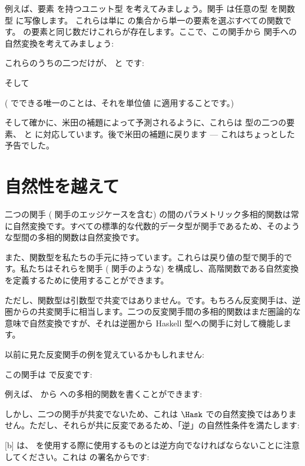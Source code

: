 例えば、要素 \code{()} を持つユニット型 \code{()} を考えてみましょう。関手  は任意の型  を関数型  に写像します。
これらは単に  の集合から単一の要素を選ぶすべての関数です。
 の要素と同じ数だけこれらが存在します。ここで、この関手から  関手への自然変換を考えてみましょう: 

これらのうちの二つだけが、 と  です: 

そして

 ( でできる唯一のことは、それを単位値 \code{()} に適用することです。) 

そして確かに、米田の補題によって予測されるように、これらは  型の二つの要素、 と  に対応しています。後で米田の補題に戻ります --- これはちょっとした予告でした。

\section{自然性を越えて}

二つの関手 ( 関手のエッジケースを含む) の間のパラメトリック多相的関数は常に自然変換です。すべての標準的な代数的データ型が関手であるため、そのような型間の多相的関数は自然変換です。

また、関数型を私たちの手元に持っています。これらは戻り値の型で関手的です。私たちはそれらを関手 ( 関手のような) を構成し、高階関数である自然変換を定義するために使用することができます。

ただし、関数型は引数型で共変ではありません。です。もちろん反変関手は、逆圏からの共変関手に相当します。二つの反変関手間の多相的関数はまだ圏論的な意味で自然変換ですが、それは逆圏から Haskell 型への関手に対して機能します。

以前に見た反変関手の例を覚えているかもしれません: 

この関手は  で反変です: 

例えば、 から  への多相的関数を書くことができます: 

しかし、二つの関手が共変でないため、これは $\Hask$ での自然変換ではありません。ただし、それらが共に反変であるため、「逆」の自然性条件を満たします: 

[b]
 は、 を使用する際に使用するものとは逆方向でなければならないことに注意してください。これは  の署名からです: 


